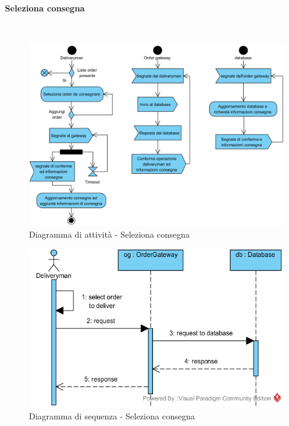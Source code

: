 \begin{samepage}
\paragraph{Seleziona consegna}\mbox{}\\
\begin{figure}[H]
	\centering
	\includegraphics[width=14cm]{diagrammi_img/attivita/deliveryman_seleziona.png}
	\caption{Diagramma di attività - Seleziona consegna}
\end{figure}
\end{samepage}
\begin{figure}[H]
	\centering
	\includegraphics[width=14cm]{../../documenti/SpecificaTecnica/diagrammi_img/sequenza/fattorino_seleziona_consegna.png}
	\caption{Diagramma di sequenza - Seleziona consegna}
\end{figure}
